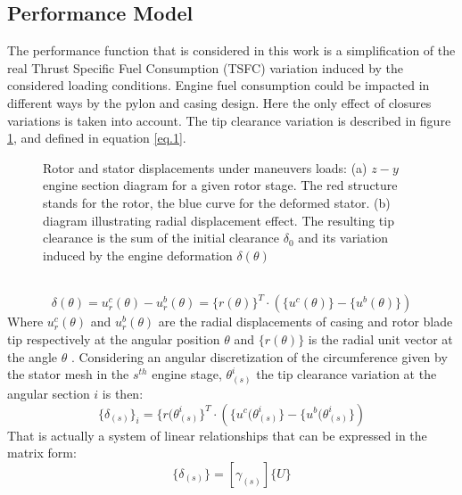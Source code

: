 \subsection{Performance Model}
\label{ssec1.2.2}
The performance function that is considered in this work is a simplification of the real Thrust Specific Fuel Consumption (TSFC) variation induced by the considered loading conditions. Engine fuel consumption could be impacted in different ways by the pylon and casing design. Here the only effect of closures variations is taken into account.
The tip clearance variation is described in figure \ref{f.2}, and defined in equation \eqref{eq.1}.
  \\
  \begin{figure}[hbt!]
  \centering
       \caption{Rotor and stator displacements under maneuvers loads: (a) $z-y$ engine section diagram for a given rotor stage. The red structure stands for the rotor, the blue curve for the deformed stator. (b) diagram illustrating radial displacement effect.
       The resulting tip clearance is the sum of the initial clearance $\delta_0$ and its variation induced by the engine deformation $\delta(\theta)$ }
       \label{f.2}
     \end{figure}
  \\
\begin{equation}
\label{eq.1}
\delta(\theta)=u_r^c(\theta)-u_r^b(\theta)=\lbrace r( \theta ) \rbrace^T \cdot \left( \lbrace u^c(\theta) \rbrace-\lbrace u^b(\theta) \rbrace\right)
\end{equation}
Where $u_r^c(\theta)$ and $u_r^b(\theta)$  are the radial displacements of casing and rotor blade tip respectively at the angular position $\theta$ and $\lbrace r( \theta ) \rbrace$ is the radial unit vector at the angle $\theta$ .
Considering an angular discretization of the circumference given by the stator mesh in the $s^{th}$ engine stage, $\theta^i_{(s)}$ the tip clearance variation at the angular section $i$ is then:	
\begin{equation}
\lbrace\delta_{(s)}\rbrace_i=\lbrace r( \theta^i_{(s) } \rbrace^T \cdot \left( \lbrace u^c(\theta^i_{(s)} \rbrace-\lbrace u^b(\theta^i_{(s)} \rbrace\right)
\end{equation}
That is actually a system of linear relationships that can be expressed in the matrix form:
\begin{equation}
\label{e.3}
\lbrace\delta_{(s)}\rbrace =\left[ \gamma_{(s)} \right] \lbrace U \rbrace
\end{equation}
